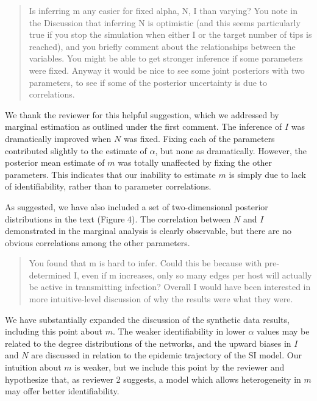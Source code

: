 \documentclass[12pt]{letter}
\begin{document}
\begin{letter}{ }
\begin{quote}
  \itshape

  Is inferring m any easier for fixed alpha, N, I than varying? You note in the
  Discussion that inferring N is optimistic (and this seems particularly true
  if you stop the simulation when either I or the target number of tips is
  reached), and you briefly comment about the relationships between the
  variables. You might be able to get stronger inference if some parameters
  were fixed. Anyway it would be nice to see some joint posteriors with two
  parameters, to see if some of the posterior uncertainty is due to
  correlations.
\end{quote}

We thank the reviewer for this helpful suggestion, which we addressed by
marginal estimation as outlined under the first comment. The inference of $I$
was dramatically improved when $N$ was fixed. Fixing each of the parameters
contributed slightly to the estimate of $\alpha$, but none as dramatically.
However, the posterior mean estimate of $m$ was totally unaffected by fixing
the other parameters. This indicates that our inability to estimate $m$ is
simply due to lack of identifiability, rather than to parameter correlations. 

As suggested, we have also included a set of two-dimensional posterior
distributions in the text (Figure 4). The correlation between $N$ and $I$
demonstrated in the marginal analysis is clearly observable, but there are no
obvious correlations among the other parameters.

\begin{quote}
  \itshape

  You found that m is hard to infer. Could this be because with pre-determined
  I, even if m increases, only so many edges per host will actually be active
  in transmitting infection? Overall I would have been interested in more
  intuitive-level discussion of why the results were what they were.
\end{quote}

We have substantially expanded the discussion of the synthetic data results,
including this point about $m$. The weaker identifiability in lower $\alpha$
values may be related to the degree distributions of the networks, and the
upward biases in $I$ and $N$ are discussed in relation to the epidemic
trajectory of the SI model. Our intuition about $m$ is weaker, but we include
this point by the reviewer and hypothesize that, as reviewer 2 suggests, a
model which allows heterogeneity in $m$ may offer better identifiability.


\end{letter}
\end{document}
